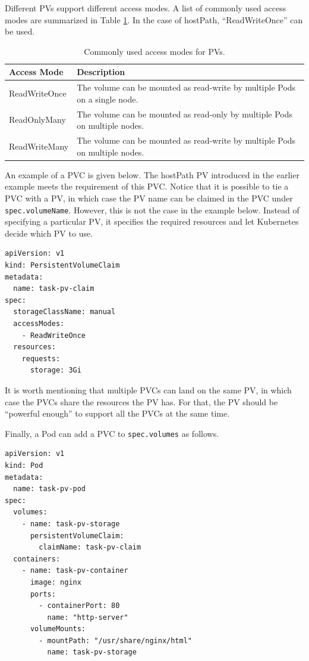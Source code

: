 Different PVs support different access modes. A list of commonly used access modes are summarized in Table \ref{tab:access_modes_pv}. In the case of hostPath, ``ReadWriteOnce'' can be used.
\begin{table}[!htb]
	\centering \caption{Commonly used access modes for PVs.}\label{tab:access_modes_pv}
	\begin{tabularx}{\textwidth}{lX}
	\hline
	Access Mode & Description \\
	\hline
	ReadWriteOnce & The volume can be mounted as read-write by multiple Pods on a single node. \\
	ReadOnlyMany & The volume can be mounted as read-only by multiple Pods on multiple nodes. \\
	ReadWriteMany & The volume can be mounted as read-write by multiple Pods on multiple nodes. \\
	\hline
	\end{tabularx}
\end{table}

An example of a PVC is given below. The hostPath PV introduced in the earlier example meets the requirement of this PVC. Notice that it is possible to tie a PVC with a PV, in which case the PV name can be claimed in the PVC under \verb|spec.volumeName|. However, this is not the case in the example below. Instead of specifying a particular PV, it specifies the required resources and let Kubernetes decide which PV to use.
\begin{lstlisting}
apiVersion: v1
kind: PersistentVolumeClaim
metadata:
  name: task-pv-claim
spec:
  storageClassName: manual
  accessModes:
    - ReadWriteOnce
  resources:
    requests:
      storage: 3Gi
\end{lstlisting}
It is worth mentioning that multiple PVCs can land on the same PV, in which case the PVCs share the resources the PV has. For that, the PV should be ``powerful enough'' to support all the PVCs at the same time.

Finally, a Pod can add a PVC to \verb|spec.volumes| as follows.
\begin{lstlisting}
apiVersion: v1
kind: Pod
metadata:
  name: task-pv-pod
spec:
  volumes:
    - name: task-pv-storage
      persistentVolumeClaim:
        claimName: task-pv-claim
  containers:
    - name: task-pv-container
      image: nginx
      ports:
        - containerPort: 80
          name: "http-server"
      volumeMounts:
        - mountPath: "/usr/share/nginx/html"
          name: task-pv-storage
\end{lstlisting}

